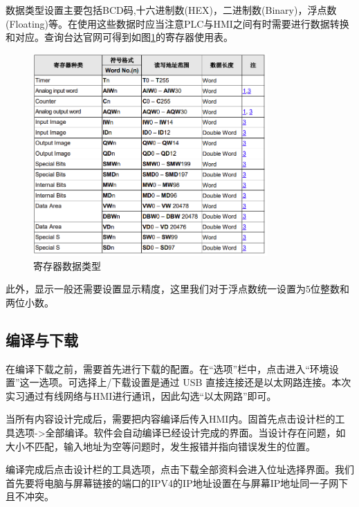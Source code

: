 \documentclass[UTF8]{article}
\begin{document}
数据类型设置主要包括BCD码,十六进制数(HEX)，二进制数(Binary)，浮点数(Floating)等。在使用这些数据时应当注意PLC与HMI之间有时需要进行数据转换和对应。查询台达官网可得到如图\ref{fig:img17}的寄存器使用表。
\begin{figure}[H]
    \centering %
    \includegraphics[width=0.8\textwidth]{figure/寄存器数据类型.png} 
    \caption{寄存器数据类型} %
    \label{fig:img17} %
\end{figure}

此外，显示一般还需要设置显示精度，这里我们对于浮点数统一设置为5位整数和两位小数。

\subsection{编译与下载}
在编译下载之前，需要首先进行下载的配置。在“选项”栏中，点击进入“环境设置”这一选项。可选择上/下载设置是通过 USB 直接连接还是以太网路连接。本次实习通过有线网络与HMI进行通讯，因此勾选“以太网路”即可。

当所有内容设计完成后，需要把内容编译后传入HMI内。固首先点击设计栏的工具选项->全部编译。软件会自动编译已经设计完成的界面。当设计存在问题，如大小不匹配，输入地址为空等问题时，发生报错并指向错误发生的位置。

编译完成后点击设计栏的工具选项，点击下载全部资料会进入位址选择界面。我们首先要将电脑与屏幕链接的端口的IPV4的IP地址设置在与屏幕IP地址同一子网下且不冲突。
\end{document}
